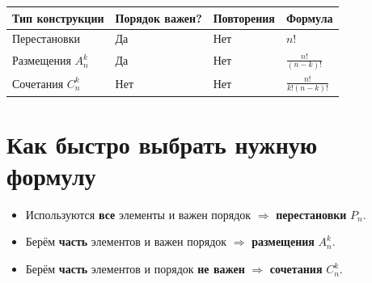 \begin{table}[h]
\begin{tabular}{|l|l|l|l|}
\hline Тип конструкции & Порядок важен? & Повторения & Формула \\
\hline Перестановки & Да & Нет & $n!$ \\
\hline Размещения $A_n^k$ & Да & Нет & $\frac{n!}{(n-k)!}$ \\
\hline Сочетания $C_n^k$ & Нет & Нет & $\frac{n!}{k!(n-k)!}$ \\
\hline
\end{tabular}
\end{table}


\newpage

\hspace{3mm}

\section{Как быстро выбрать нужную формулу}

\begin{itemize}
    \item Используются \textbf{все} элементы и важен порядок $\Rightarrow$ \textbf{перестановки} $P_n$.
    \item Берём \textbf{часть} элементов и важен порядок $\Rightarrow$ \textbf{размещения} $A_n^k$.
    \item Берём \textbf{часть} элементов и порядок \textbf{не важен} $\Rightarrow$ \textbf{сочетания} $C_n^k$.
\end{itemize}
